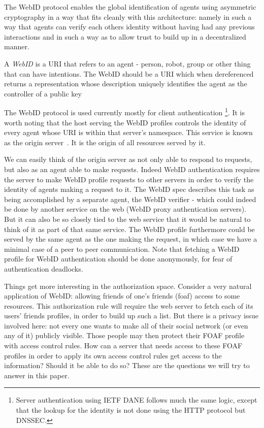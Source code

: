 \documentclass[a4paper]{llncs}
\begin{document}
The WebID protocol enables the global identification of agents using asymmetric cryptography in a way that fits cleanly with this architecture: namely in such a way that agents can verify each others identity without having had any previous interactions and in such a way as to allow trust to build up in a decentralized manner.

A \textit{WebID} is a URI that refers to an agent - person, robot, group or other thing that can have intentions.
The WebID should be a URI which when dereferenced returns a representation whose description uniquely identifies the agent as the controller of a public key~\cite{sporny-m-2011--a,story-h-2009--a}

The WebID protocol is used currently mostly for client authentication%
\footnote{Server authentication using IETF DANE follows much the same logic, except that the lookup for the identity is not done using the HTTP protocol but DNSSEC.}.
It is worth noting that the host serving the WebID profiles controls the identity of every agent whose URI is within that server's namespace.
This service is known as the origin server~\cite{barth-a-2011--a}.
It is the origin of all resources served by it. 

We can easily think of the origin server as not only able to respond to requests, but also as an agent able to make requests.
Indeed WebID authentication requires the server to make WebID profile requests to other servers in order to verify the identity of agents making a request to it.
The WebID spec describes this task as being accomplished by a separate agent, the WebID verifier - which could indeed be done by another service on the web (WebID proxy authentication servers).
But it can also be so closely tied to the web service that it would be natural to think of it as part of that same service.
The WebID profile furthermore could be served by the same agent as the one making the request, in which case we have a minimal case of a peer to peer communication.
Note that fetching a WebID profile for WebID authentication should be done anonymously, for fear of authentication deadlocks.

Things get more interesting in the authorization space.
Consider a very natural application of WebID: allowing friends of one's friends (foaf) access to some resources.
This authorization rule will require the web server to fetch each of its users' friends profiles, in order to build up such a list.
But there is a privacy issue involved here: not every one wants to make all of their social network (or even any of it) publicly visible.
Those people may then protect their FOAF profile with access control rules.
How can a server that needs access to these FOAF profiles in order to apply its own access control rules get access to the information?
Should it be able to do so?
These are the questions we will try to answer in this paper.
\end{document}
